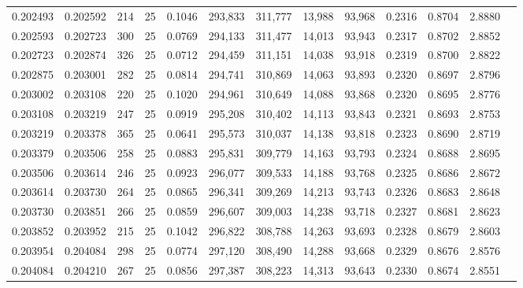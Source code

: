 \begin{tabular}{rrrrrrrrrrrrr}
0.202493 & 0.202592 &   214 &  25 &                                     0.1046 & 293,833 & 311,777 &  13,988 &  93,968 & 0.2316 & 0.8704 & 2.8880 \\
0.202593 & 0.202723 &   300 &  25 &                                     0.0769 & 294,133 & 311,477 &  14,013 &  93,943 & 0.2317 & 0.8702 & 2.8852 \\
0.202723 & 0.202874 &   326 &  25 &                                     0.0712 & 294,459 & 311,151 &  14,038 &  93,918 & 0.2319 & 0.8700 & 2.8822 \\
0.202875 & 0.203001 &   282 &  25 &                                     0.0814 & 294,741 & 310,869 &  14,063 &  93,893 & 0.2320 & 0.8697 & 2.8796 \\
0.203002 & 0.203108 &   220 &  25 &                                     0.1020 & 294,961 & 310,649 &  14,088 &  93,868 & 0.2320 & 0.8695 & 2.8776 \\
0.203108 & 0.203219 &   247 &  25 &                                     0.0919 & 295,208 & 310,402 &  14,113 &  93,843 & 0.2321 & 0.8693 & 2.8753 \\
0.203219 & 0.203378 &   365 &  25 &                                     0.0641 & 295,573 & 310,037 &  14,138 &  93,818 & 0.2323 & 0.8690 & 2.8719 \\
0.203379 & 0.203506 &   258 &  25 &                                     0.0883 & 295,831 & 309,779 &  14,163 &  93,793 & 0.2324 & 0.8688 & 2.8695 \\
0.203506 & 0.203614 &   246 &  25 &                                     0.0923 & 296,077 & 309,533 &  14,188 &  93,768 & 0.2325 & 0.8686 & 2.8672 \\
0.203614 & 0.203730 &   264 &  25 &                                     0.0865 & 296,341 & 309,269 &  14,213 &  93,743 & 0.2326 & 0.8683 & 2.8648 \\
0.203730 & 0.203851 &   266 &  25 &                                     0.0859 & 296,607 & 309,003 &  14,238 &  93,718 & 0.2327 & 0.8681 & 2.8623 \\
0.203852 & 0.203952 &   215 &  25 &                                     0.1042 & 296,822 & 308,788 &  14,263 &  93,693 & 0.2328 & 0.8679 & 2.8603 \\
0.203954 & 0.204084 &   298 &  25 &                                     0.0774 & 297,120 & 308,490 &  14,288 &  93,668 & 0.2329 & 0.8676 & 2.8576 \\
0.204084 & 0.204210 &   267 &  25 &                                     0.0856 & 297,387 & 308,223 &  14,313 &  93,643 & 0.2330 & 0.8674 & 2.8551 \\

\end{tabular}

